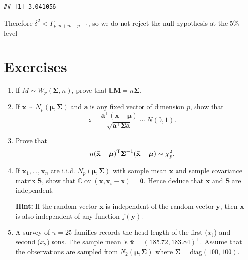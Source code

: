 \documentclass[
]{book}
\theoremstyle{definition}
\theoremstyle{definition}
\theoremstyle{definition}
\theoremstyle{definition}
\theoremstyle{remark}
\begin{document}
\begin{verbatim}
## [1] 3.041056
\end{verbatim}

Therefore \(\delta^2 < F_{p,n+m-p-1}\), so we do not reject the null hypothesis at the 5\% level.

\section{Exercises}\label{exercises-4}

\begin{enumerate}
\def\labelenumi{\arabic{enumi}.}
\item
  If \(M \sim W_p(\boldsymbol{\Sigma},n)\), prove that \({\mathbb{E}}\mathbf M= n \boldsymbol{\Sigma}\).
\item
  If \(\mathbf x\sim N_p({\boldsymbol{\mu}},\boldsymbol{\Sigma})\) and \(\mathbf a\) is any fixed vector of dimension \(p\), show that
  \[ z = \frac{ \mathbf a^\top (\mathbf x- {\boldsymbol{\mu}}) }{ \sqrt{\mathbf a^\top \boldsymbol{\Sigma}\mathbf a} } \sim N(0,1).\]
\item
  Prove that
  \[ n ( \bar{\mathbf x} - {\boldsymbol{\mu}})^{\rm T} \boldsymbol{\Sigma}^{-1} ( \bar{\mathbf x} - {\boldsymbol{\mu}}) \sim \chi_p^2 . \]
\item
  If \(\mathbf x_1, \ldots, \mathbf x_n\) are i.i.d. \(N_p({\boldsymbol{\mu}}, \boldsymbol{\Sigma})\) with sample mean \(\bar{\mathbf x}\) and sample covariance matrix \(\mathbf S\), show that \({\mathbb{C}\operatorname{ov}}(\bar{\mathbf x}, \mathbf x_i - \bar{\mathbf x}) = {\boldsymbol 0}\). Hence deduce that \(\bar{\mathbf x}\) and \(\mathbf S\) are independent.

  \textbf{Hint:} If the random vector \(\mathbf x\) is independent of the random vector \(\mathbf y\), then \(\mathbf x\) is also independent of any function \(f(\mathbf y)\).
\item
  A survey of \(n=25\) families records the head length of the first (\(x_1\)) and second (\(x_2\)) sons. The sample mean is \(\bar{\mathbf x} = (185.72, 183.84)^\top\). Assume that the observations are sampled from \(N_2({\boldsymbol{\mu}},\boldsymbol{\Sigma})\) where \(\boldsymbol{\Sigma}= \text{diag}(100,100)\).


\end{enumerate}
\end{document}
